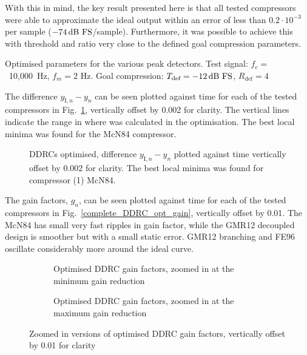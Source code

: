 \documentclass[../main2.tex]{subfiles}
\providecommand{\rootdir}{..}
\begin{document}
With this in mind, the key result presented here is that all tested compressors were able to approximate the ideal output within an error of less than $0.2\cdot 10^{-3}$ per sample ($-74 \mskip3mu\text{dB FS}$/sample). Furthermore, it was possible to achieve this with threshold and ratio very close to the defined goal compression parameters.

\begin{table}[h]
\small
\begin{center}
\caption{Optimised parameters for the various peak detectors. Test signal: $f_c=$~10,000~Hz, $f_m=2$ Hz. Goal compression: $T_\text{def}=-12 \mskip3mu\text{dB FS}$, $R_\text{def}=4$}
\label{tab:complete_DDRC_opt_params}

\end{center}
\end{table}

The difference $y_{\text{I},n} - y_n$ can be seen plotted against time for each of the tested compressors in Fig.~\ref{fig:complete_DDRC_opt_diff}, vertically offset by 0.002 for clarity. The vertical lines indicate the range in where \EN was calculated in the optimisation. The best local minima was found for the McN84 compressor.

\begin{figure}[h]
\centerline{}
\caption{DDRCs optimised, difference $y_{\text{I},n} - y_n$ plotted against time vertically offset by 0.002 for clarity. The best local minima was found for compressor (1) McN84.}
\label{fig:complete_DDRC_opt_diff}
\end{figure}

The gain factors, $g_n$, can be seen plotted against time for each of the tested compressors in Fig.~\ref{complete_DDRC_opt_gain}, vertically offset by 0.01. The McN84 has small very fast ripples in gain factor, while the GMR12 decoupled design is smoother but with a small static error. GMR12 branching and FE96 oscillate considerably more around the ideal curve.

\begin{figure}
\captionsetup{justification=centering}
\begin{subfigure}{\linewidth}
\centering
\centerline{}
\caption{Optimised DDRC gain factors, zoomed in at the minimum gain reduction}
\end{subfigure}

\par\bigskip

\captionsetup{justification=centering}
\begin{subfigure}{\linewidth}
\centering
\centerline{}
\caption{Optimised DDRC gain factors, zoomed in at the maximum gain reduction}
\label{fig:complete_DDRC_opt_gain}
\end{subfigure}

\caption{Zoomed in versions of optimised DDRC gain factors, vertically offset by 0.01 for clarity}
\label{fig:peak_det_opt_env_zoom}
\end{figure}
\end{document}
